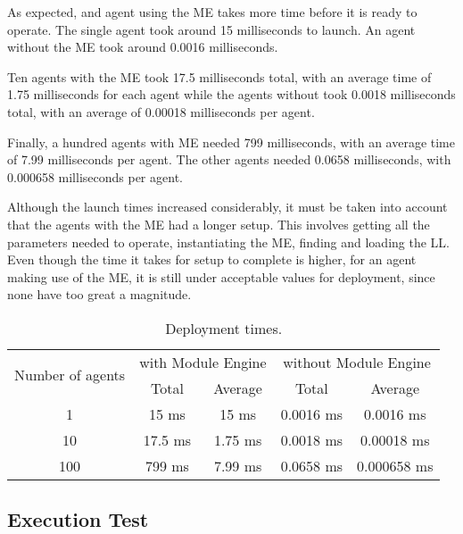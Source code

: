 As expected, and agent using the \acrshort{ME} takes more time before it is ready to operate. The single agent took around 15 milliseconds to launch. An agent without the \acrshort{ME} took around 0.0016 milliseconds.

Ten agents with the \acrshort{ME} took 17.5 milliseconds total, with an average time of 1.75 milliseconds for each agent while the agents without took 0.0018 milliseconds total, with an average of 0.00018 milliseconds per agent. 

Finally, a hundred agents with \acrshort{ME} needed 799 milliseconds, with an average time of 7.99 milliseconds per agent. The other agents needed 0.0658 milliseconds, with 0.000658 milliseconds per agent.

Although the launch times increased considerably, it must be taken into account that the agents with the \acrlong{ME} had a longer setup. This involves getting all the parameters needed to operate, instantiating the \acrshort{ME}, finding and loading the \acrshort{LL}. Even though the time it takes for setup to complete is higher, for an agent making use of the \acrshort{ME}, it is still under acceptable values for deployment, since none have too great a magnitude.

\begin{table}[h!]
	\caption{Deployment times.}
	\centering
	\begin{tabular}{|c|cc|cc|}
		\hline
		\multirow{2}{*}{Number of agents} & \multicolumn{2}{c|}{with Module Engine} 				& \multicolumn{2}{c|}{without Module Engine} \\ \cline{2-5} 
										  & \multicolumn{1}{c|}{Total}   	  & Average  			& \multicolumn{1}{c|}{Total}      			& Average  	  \\ \hline
		1                                 & \multicolumn{1}{c|}{15 ms}        & 15 ms               & \multicolumn{1}{c|}{0.0016 ms}    		& 0.0016 ms   \\ \hline
		10                                & \multicolumn{1}{c|}{17.5 ms}      & 1.75 ms             & \multicolumn{1}{c|}{0.0018 ms}    		& 0.00018 ms  \\ \hline
		100                               & \multicolumn{1}{c|}{799 ms}       & 7.99 ms             & \multicolumn{1}{c|}{0.0658 ms}  			& 0.000658 ms \\ \hline
	\end{tabular}
	\label{tab:deployment_times}
\end{table}

\subsection{Execution Test}

